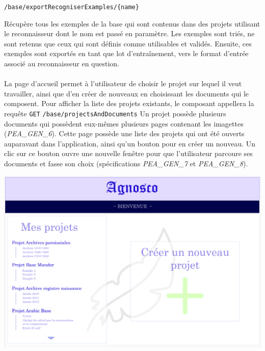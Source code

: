 \item [POST] \texttt{/base/exportRecogniserExamples/\{name\}}\newline{}
\begin{itshape}
Récupère tous les exemples de la base qui sont contenus dans des projets utilisant le reconnaisseur dont le nom est passé en paramètre. Les exemples sont triés, ne sont retenus que ceux qui sont définis comme utilisables et validés. Ensuite, ces exemples sont exportés en tant que lot d'entraînement, vers le format d'entrée associé au reconnaisseur en question.
\end{itshape}


\paragraph{}
La page d’accueil permet à l’utilisateur de choisir le projet sur lequel il veut travailler, ainsi que d'en créer de nouveaux en choisissant les documents qui le composent. Pour afficher la liste des projets existants, le composant appellera la requête \texttt{GET} \texttt{/base/projectsAndDocuments}
Un projet possède plusieurs documents qui possèdent eux-mêmes plusieurs pages contenant les imagettes (\textit{PEA\_GEN\_6}). Cette page possède une liste des projets qui ont été ouverts auparavant dans l’application, ainsi qu’un bouton pour en créer un nouveau. Un clic sur ce bouton ouvre une nouvelle fenêtre pour que l’utilisateur parcoure ses documents et fasse son choix (spécifications \textit{PEA\_GEN\_7} et \textit{PEA\_GEN\_8}).

\newpage{}
\begin{mdframed}[frametitle={Figure 1 : Maquette de la page d'accueil de l'IHM}, innerbottommargin=10]
\begin{center}
\includegraphics[scale=0.04]{assets/maquetteIHMaccueil.jpg}
\end{center}
\end{mdframed}



